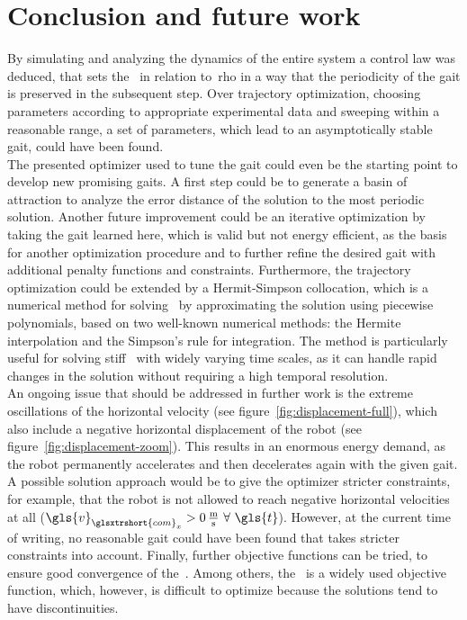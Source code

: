 \chapter{Conclusion and future work}%
\label{sec:conclusion}

By simulating and analyzing the dynamics of the entire system a control law was deduced, that sets the~ in relation to~\gls{rho} in a way that the periodicity of the gait is preserved in the subsequent step. Over trajectory optimization, choosing parameters according to appropriate experimental data and sweeping within a reasonable range, a set of parameters, which lead to an asymptotically stable gait, could have been found. \\

The presented optimizer used to tune the gait could even be the starting point to develop new promising gaits. A first step could be to generate a basin of attraction to analyze the error distance of the solution to the most periodic solution. Another future improvement could be an iterative optimization by taking the gait learned here, which is valid but not energy efficient, as the basis for another optimization procedure and to further refine the desired gait with additional penalty functions and constraints. Furthermore, the trajectory optimization could be extended by a Hermit-Simpson collocation, which is a numerical method for solving~ by approximating the solution using piecewise polynomials, based on two well-known numerical methods: the Hermite interpolation and the Simpson's rule for integration. The method is particularly useful for solving stiff~ with widely varying time scales, as it can handle rapid changes in the solution without requiring a high temporal resolution.~\cite{Kelly2017}  \\

An ongoing issue that should be addressed in further work is the extreme oscillations of the horizontal velocity (see figure~\ref{fig:displacement-full}), which also include a negative horizontal displacement of the robot (see figure~\ref{fig:displacement-zoom}). This results in an enormous energy demand, as the robot permanently accelerates and then decelerates again with the given gait. A possible solution approach would be to give the optimizer stricter constraints, for example, that the robot is not allowed to reach negative horizontal velocities at all ($\gls{v}_{\glsxtrshort{com}_x} > 0\,\textrm{\si{\metre\per\second}}~\forall~\gls{t}$). However, at the current time of writing, no reasonable gait could have been found that takes stricter constraints into account. Finally, further objective functions can be tried, to ensure good convergence of the~. Among others, the~ is a widely used objective function, which, however, is difficult to optimize because the solutions tend to have discontinuities.~\cite{Kelly2017}
